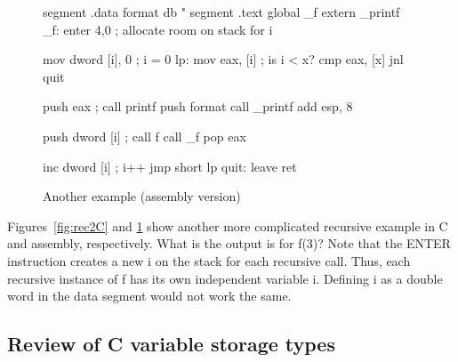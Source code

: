 \begin{figure}
\begin{AsmCodeListing}[frame=single]
segment .data
format       db "%
segment .text
      global _f
      extern _printf
_f:
      enter  4,0           ; allocate room on stack for i

      mov    dword [i], 0  ; i = 0
lp:
      mov    eax, [i]      ; is i < x?
      cmp    eax, [x]
      jnl    quit

      push   eax           ; call printf
      push   format
      call   _printf
      add    esp, 8

      push   dword [i]     ; call f
      call   _f
      pop    eax

      inc    dword [i]     ; i++
      jmp    short lp
quit:
      leave
      ret
\end{AsmCodeListing}
\caption{Another example (assembly version)\label{fig:rec2Asm}}
\end{figure}

Figures~\ref{fig:rec2C} and \ref{fig:rec2Asm} show another more
complicated recursive example in C and assembly, respectively. What is
the output is for {\code f(3)}? Note that the {\code ENTER} instruction
creates a new {\code i} on the stack for each recursive call. Thus, each
recursive instance of {\code f} has its own independent variable {\code i}.
Defining {\code i} as a double word in the {\code data} segment would not
work the same. 

\subsection{Review of C variable storage types}

